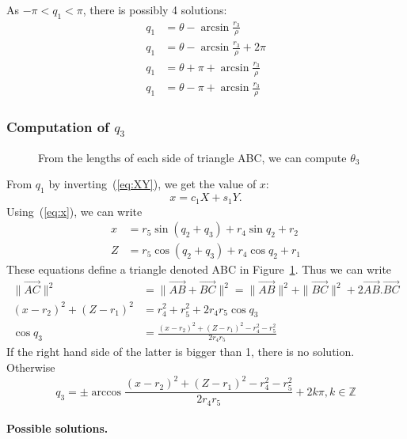 \documentclass{article}
\begin{document}
As $-\pi < q_1 < \pi$, there is possibly 4 solutions:
\begin{align*}
  q_1 &= \theta - \arcsin \frac{r_3}{\rho} \\
  q_1 &= \theta - \arcsin \frac{r_3}{\rho} + 2\pi\\
  q_1 &= \theta + \pi + \arcsin\frac{r_3}{\rho} \\
  q_1 &= \theta - \pi + \arcsin\frac{r_3}{\rho}
\end{align*}

\subsubsection*{Computation of $q_3$}

\begin{figure}[h]
  \begin{center}
    \def\svgwidth {.6\linewidth}
    \graphicspath{{./figures/}}
    
  \end{center}
  \caption{From the lengths of each side of triangle ABC, we can compute $\theta_3$}
  \label{fig:triangle}
\end{figure}

From $q_1$  by inverting~(\ref{eq:XY}), we get the value of $x$:
$$
x = c_1 X + s_1 Y.
$$
Using~(\ref{eq:x}), we can write
\begin{align}
  \label{eq:x:1}
  x &= r_5\sin(q_{2}+q_{3})+r_4\sin q_2+r_2 \\
  \label{eq:Z:1}
  Z &= r_5\cos(q_{2}+q_{3})+r_4\cos q_2+r_1
\end{align}
These equations define a triangle denoted ABC in Figure~\ref{fig:triangle}. Thus we can write
\begin{align*}
  \|\vec{AC}\|^2 &= \|\vec{AB}+\vec{BC}\|^2 = \|\vec{AB}\|^2 + \|\vec{BC}\|^2 + 2\vec{AB}.\vec{BC}\\
  (x-r_2)^2 + (Z-r_1)^2 &= r_4^2 + r_5^2 + 2r_4r_5\cos q_3 \\
  \cos q_3 &= \frac{(x-r_2)^2 + (Z-r_1)^2 - r_4^2 - r_5^2}{2r_4r_5}
\end{align*}
If the right hand side of the latter is bigger than 1, there is no solution. Otherwise
\begin{equation}\label{eq:q3}
  q_3 = \pm \arccos \frac{(x-r_2)^2 + (Z-r_1)^2 - r_4^2 - r_5^2}{2r_4r_5} + 2k\pi, k\in\mathbb{Z}
\end{equation}

\paragraph{Possible solutions.}
\end{document}
